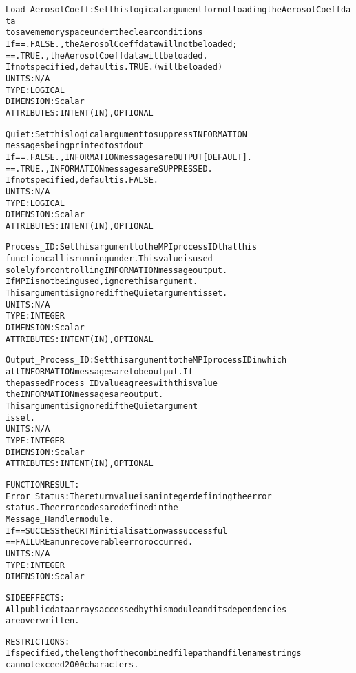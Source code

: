 \begin{alltt}
        Load_AerosolCoeff:  Set this logical argument for not loading the AerosolCoeff data
                            to save memory space under the clear conditions 
                            If == .FALSE., the AerosolCoeff data will not be loaded;
                               == .TRUE.,  the AerosolCoeff data will be loaded.
                            If not specified, default is .TRUE. (will be loaded)
                            UNITS:      N/A
                            TYPE:       LOGICAL
                            DIMENSION:  Scalar
                            ATTRIBUTES: INTENT(IN), OPTIONAL
 
        Quiet:              Set this logical argument to suppress INFORMATION
                            messages being printed to stdout
                            If == .FALSE., INFORMATION messages are OUTPUT [DEFAULT].
                               == .TRUE.,  INFORMATION messages are SUPPRESSED.
                            If not specified, default is .FALSE.
                            UNITS:      N/A
                            TYPE:       LOGICAL
                            DIMENSION:  Scalar
                            ATTRIBUTES: INTENT(IN), OPTIONAL
 
        Process_ID:         Set this argument to the MPI process ID that this
                            function call is running under. This value is used
                            solely for controlling INFORMATION message output.
                            If MPI is not being used, ignore this argument.
                            This argument is ignored if the Quiet argument is set.
                            UNITS:      N/A
                            TYPE:       INTEGER
                            DIMENSION:  Scalar
                            ATTRIBUTES: INTENT(IN), OPTIONAL
 
        Output_Process_ID:  Set this argument to the MPI process ID in which
                            all INFORMATION messages are to be output. If
                            the passed Process_ID value agrees with this value
                            the INFORMATION messages are output. 
                            This argument is ignored if the Quiet argument
                            is set.
                            UNITS:      N/A
                            TYPE:       INTEGER
                            DIMENSION:  Scalar
                            ATTRIBUTES: INTENT(IN), OPTIONAL
 
  FUNCTION RESULT:
        Error_Status:       The return value is an integer defining the error
                            status. The error codes are defined in the
                            Message_Handler module.
                            If == SUCCESS the CRTM initialisation was successful
                               == FAILURE an unrecoverable error occurred.
                            UNITS:      N/A
                            TYPE:       INTEGER
                            DIMENSION:  Scalar
 
  SIDE EFFECTS:
        All public data arrays accessed by this module and its dependencies
        are overwritten.
 
  RESTRICTIONS:
        If specified, the length of the combined file path and filename strings
        cannot exceed 2000 characters.
 
  \end{alltt}
